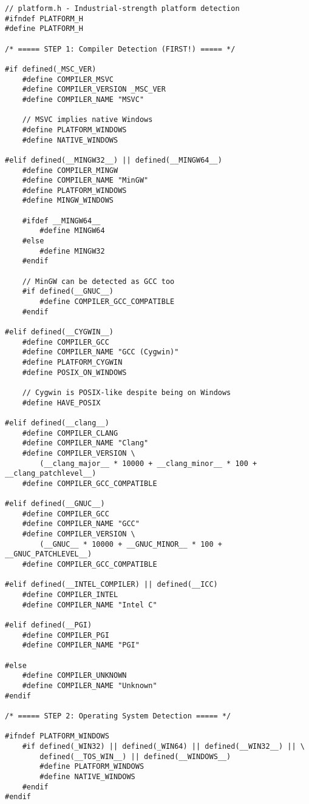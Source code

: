 \begin{lstlisting}
// platform.h - Industrial-strength platform detection
#ifndef PLATFORM_H
#define PLATFORM_H

/* ===== STEP 1: Compiler Detection (FIRST!) ===== */

#if defined(_MSC_VER)
    #define COMPILER_MSVC
    #define COMPILER_VERSION _MSC_VER
    #define COMPILER_NAME "MSVC"

    // MSVC implies native Windows
    #define PLATFORM_WINDOWS
    #define NATIVE_WINDOWS

#elif defined(__MINGW32__) || defined(__MINGW64__)
    #define COMPILER_MINGW
    #define COMPILER_NAME "MinGW"
    #define PLATFORM_WINDOWS
    #define MINGW_WINDOWS

    #ifdef __MINGW64__
        #define MINGW64
    #else
        #define MINGW32
    #endif

    // MinGW can be detected as GCC too
    #if defined(__GNUC__)
        #define COMPILER_GCC_COMPATIBLE
    #endif

#elif defined(__CYGWIN__)
    #define COMPILER_GCC
    #define COMPILER_NAME "GCC (Cygwin)"
    #define PLATFORM_CYGWIN
    #define POSIX_ON_WINDOWS

    // Cygwin is POSIX-like despite being on Windows
    #define HAVE_POSIX

#elif defined(__clang__)
    #define COMPILER_CLANG
    #define COMPILER_NAME "Clang"
    #define COMPILER_VERSION \
        (__clang_major__ * 10000 + __clang_minor__ * 100 + __clang_patchlevel__)
    #define COMPILER_GCC_COMPATIBLE

#elif defined(__GNUC__)
    #define COMPILER_GCC
    #define COMPILER_NAME "GCC"
    #define COMPILER_VERSION \
        (__GNUC__ * 10000 + __GNUC_MINOR__ * 100 + __GNUC_PATCHLEVEL__)
    #define COMPILER_GCC_COMPATIBLE

#elif defined(__INTEL_COMPILER) || defined(__ICC)
    #define COMPILER_INTEL
    #define COMPILER_NAME "Intel C"

#elif defined(__PGI)
    #define COMPILER_PGI
    #define COMPILER_NAME "PGI"

#else
    #define COMPILER_UNKNOWN
    #define COMPILER_NAME "Unknown"
#endif

/* ===== STEP 2: Operating System Detection ===== */

#ifndef PLATFORM_WINDOWS
    #if defined(_WIN32) || defined(_WIN64) || defined(__WIN32__) || \
        defined(__TOS_WIN__) || defined(__WINDOWS__)
        #define PLATFORM_WINDOWS
        #define NATIVE_WINDOWS
    #endif
#endif


\end{lstlisting}
